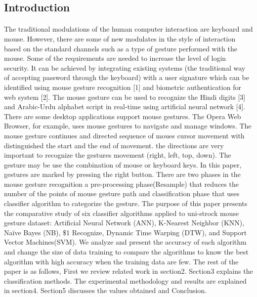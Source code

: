 \documentclass[twoside]{article}
\begin{document}
\begin{multicols}{2}
\section{Introduction}
\paragraph{}The traditional modulations of the human computer interaction are keyboard and mouse. However, there are some of new modulates in the style of interaction based on the standard channels such as a type of gesture performed with the mouse. Some of the requirements are needed to increase the level of login security. It can be achieved by integrating existing systems (the traditional way of accepting password through the keyboard) with a user signature which can be identified using mouse gesture recognition [1] and biometric authentication for web system [2]. The mouse gesture can be used to recognize the Hindi digits [3] and Arabic-Urdu alphabet script in real-time using artificial neural network [4]. There are some desktop applications support mouse gestures. The Opera Web Browser, for example, uses mouse gestures to navigate and manage windows.
The mouse gesture continues and directed sequence of moues cursor movement with distinguished the start and the end of movement. the directions are very important to recognize the gestures movement (right, left, top, down). The gesture may be use the combination of mouse or keyboard keys. In this paper, gestures are marked by pressing the right button. There are two phases in the mouse gesture recognition a pre-processing phase(Resample) that reduces the number of the points of mouse gesture path and classification phase that uses classifier algorithm to categorize the gesture. 
The purpose of this paper presents the comparative study of six classifier algorithms applied to uni-strock mouse gesture dataset: Artificial Neural Network (ANN), K-Nearest Neighbor (KNN), Na\"{i}ve Bayes (NB), \$1 Recognize, Dynamic Time Warping (DTW), and Support Vector Machines(SVM). We analyze and present the accuracy of each algorithm and change the size of data training to compare the algorithms to know the best algorithm with high accuracy when the training data are few. The rest of the paper is as follows, First we review related work in section2. Section3 explains the classification methods. The experimental methodology and results are explained in section4. Section5 discusses the values obtained and Conclusion. 


\end{multicols}
\end{document}
